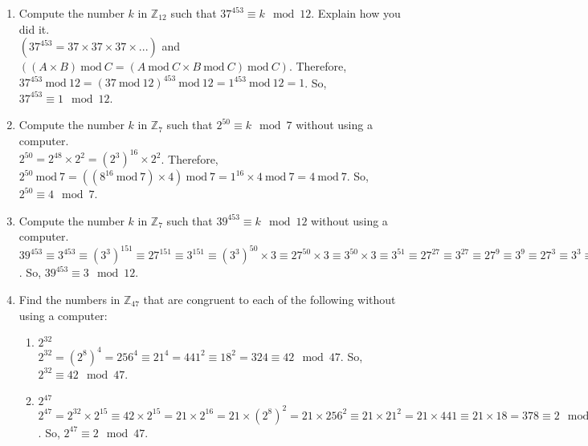 \documentclass{article}
\begin{document}
\begin{enumerate}
      \item Compute the number $k$ in $\mathbb{Z}_{12}$ such that $37^{453} \equiv k \mod{12}$. Explain how you did it.\\
            $(37^{453} = 37 \times 37 \times 37 \times ...)$ and $((A \times B)\ \text{mod}\ C = (A\ \text{mod}\ C \times B\ \text{mod}\ C)\ \text{mod}\ C)$. Therefore, $37^{453}\ \text{mod}\ 12 = (37\ \text{mod}\ 12)^{453}\ \text{mod}\ 12 = 1^{453}\ \text{mod}\ 12 = 1$. So, $37^{453} \equiv 1 \mod{12}$.
      \item Compute the number $k$ in $\mathbb{Z}_{7}$ such that $2^{50} \equiv k \mod{7}$ without using a computer.\\
            $2^{50} = 2^{48} \times 2^{2} = (2^{3})^{16} \times 2^{2}$. Therefore, $2^{50}\ \text{mod}\ 7 = ((8^{16}\ \text{mod}\ 7) \times 4)\ \text{mod}\ 7 = 1^{16} \times 4\ \text{mod}\ 7 = 4\ \text{mod}\ 7$. So, $2^{50} \equiv 4 \mod{7}$.
      \item Compute the number $k$ in $\mathbb{Z}_{7}$ such that $39^{453} \equiv k \mod{12}$ without using a computer.\\
            $39^{453} \equiv 3^{453} \equiv (3^{3})^{151} \equiv 27^{151} \equiv 3^{151} \equiv (3^{3})^{50} \times 3 \equiv 27^{50} \times 3 \equiv 3^{50} \times 3 \equiv 3^{51} \equiv 27^{27} \equiv 3^{27} \equiv 27^{9} \equiv 3^{9} \equiv 27^{3} \equiv 3^{3} \equiv 27 \equiv 3$. So, $39^{453} \equiv 3 \mod{12}$.
      \item Find the numbers in $\mathbb{Z}_{47}$ that are congruent to each of the following without using a computer:
            \begin{enumerate}
                  \item $2^{32}$\\
                        $2^{32} = (2^{8})^{4} = 256^{4} \equiv 21^{4} = 441^{2} \equiv 18^{2} = 324 \equiv 42 \mod{47}$. So, $2^{32} \equiv 42 \mod{47}$.
                  \item $2^{47}$\\
                        $2^{47} = 2^{32} \times 2^{15} \equiv 42 \times 2^{15} = 21 \times 2^{16} = 21 \times (2^{8})^{2} = 21 \times 256^{2} \equiv 21 \times 21^{2} = 21 \times 441 \equiv 21 \times 18 = 378 \equiv 2 \mod{47}$. So, $2^{47} \equiv 2 \mod{47}$.

\end{enumerate}
\end{enumerate}
\end{document}
